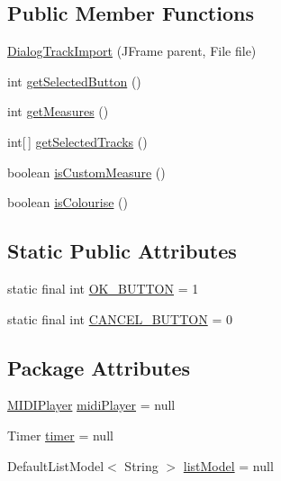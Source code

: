 \subsection*{Public Member Functions}
\begin{DoxyCompactItemize}
\item 
\hyperlink{classcom_1_1lclion_1_1midigui_1_1_dialog_track_import_a2ec034a8f00a81096e52e15c9a4af6a0}{Dialog\+Track\+Import} (J\+Frame parent, File file)
\item 
int \hyperlink{classcom_1_1lclion_1_1midigui_1_1_dialog_track_import_a06989205c167600faad7f71160a05adf}{get\+Selected\+Button} ()
\item 
int \hyperlink{classcom_1_1lclion_1_1midigui_1_1_dialog_track_import_aecf15bd6d5f5cb5cc99fc780b0f992d9}{get\+Measures} ()
\item 
int\mbox{[}$\,$\mbox{]} \hyperlink{classcom_1_1lclion_1_1midigui_1_1_dialog_track_import_a73bbdb2ddcd6001e36559b5c2f65201b}{get\+Selected\+Tracks} ()
\item 
boolean \hyperlink{classcom_1_1lclion_1_1midigui_1_1_dialog_track_import_a7550ebb9d4b246937d72d6967e5c1c81}{is\+Custom\+Measure} ()
\item 
boolean \hyperlink{classcom_1_1lclion_1_1midigui_1_1_dialog_track_import_a31f82d1e457f59ee2e2b76781cf77998}{is\+Colourise} ()
\end{DoxyCompactItemize}
\subsection*{Static Public Attributes}
\begin{DoxyCompactItemize}
\item 
static final int \hyperlink{classcom_1_1lclion_1_1midigui_1_1_dialog_track_import_a0d5e8af086fbdf1f855bbc114cd0a41b}{O\+K\+\_\+\+B\+U\+T\+T\+O\+N} = 1
\item 
static final int \hyperlink{classcom_1_1lclion_1_1midigui_1_1_dialog_track_import_a2728e079b37f5a8285d238ac2cc8224f}{C\+A\+N\+C\+E\+L\+\_\+\+B\+U\+T\+T\+O\+N} = 0
\end{DoxyCompactItemize}
\subsection*{Package Attributes}
\begin{DoxyCompactItemize}
\item 
\hyperlink{classcom_1_1lclion_1_1midiplayer_1_1_m_i_d_i_player}{M\+I\+D\+I\+Player} \hyperlink{classcom_1_1lclion_1_1midigui_1_1_dialog_track_import_ab4562caaf138ca21b1013043d3eb158d}{midi\+Player} = null
\item 
Timer \hyperlink{classcom_1_1lclion_1_1midigui_1_1_dialog_track_import_aaf7e0389622e8f7b78393ee10d8e93a4}{timer} = null
\item 
Default\+List\+Model$<$ String $>$ \hyperlink{classcom_1_1lclion_1_1midigui_1_1_dialog_track_import_acfc0ecfa0a6e94d900b31a8212d60c97}{list\+Model} = null
\end{DoxyCompactItemize}
